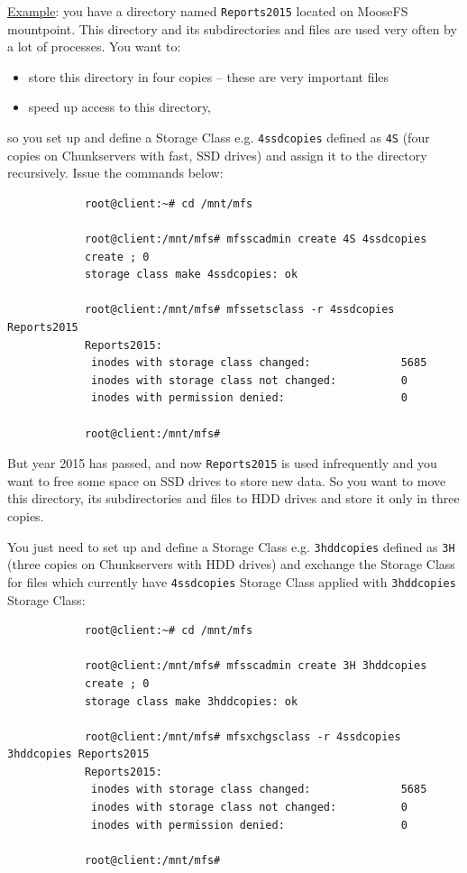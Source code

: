 \documentclass[a4paper,11pt,english]{report}
\def\code#1{\texttt{#1}}
\begin{document}
			\underline{Example}: you have a directory named \code{Reports2015} located on MooseFS mountpoint. This directory and its subdirectories and files are used very often by a lot of processes. You want to:
			
			\begin{itemize}
				\item store this directory in four copies -- these are very important files
				\item speed up access to this directory,
			\end{itemize}
			
			so you set up and define a Storage Class e.g. \code{4ssdcopies} defined as \code{4S} (four copies on Chunkservers with fast, SSD drives) and assign it to the directory recursively. Issue the commands below:
			
			\begin{lstlisting}
			root@client:~# cd /mnt/mfs
			
			root@client:/mnt/mfs# mfsscadmin create 4S 4ssdcopies
			create ; 0
			storage class make 4ssdcopies: ok
			
			root@client:/mnt/mfs# mfssetsclass -r 4ssdcopies Reports2015
			Reports2015:
			 inodes with storage class changed:              5685
			 inodes with storage class not changed:          0
			 inodes with permission denied:                  0
			 
			root@client:/mnt/mfs#
			\end{lstlisting}
			
			But year 2015 has passed, and now \code{Reports2015} is used infrequently and you want to free some space on SSD drives to store new data. So you want to move this directory, its subdirectories and files to HDD drives and store it only in three copies.
			
			You just need to set up and define a Storage Class e.g. \code{3hddcopies} defined as \code{3H} (three copies on Chunkservers with HDD drives) and exchange the Storage Class for files which currently have \code{4ssdcopies} Storage Class applied with \code{3hddcopies} Storage Class:
			
			\begin{lstlisting}
			root@client:~# cd /mnt/mfs
			
			root@client:/mnt/mfs# mfsscadmin create 3H 3hddcopies
			create ; 0
			storage class make 3hddcopies: ok
			
			root@client:/mnt/mfs# mfsxchgsclass -r 4ssdcopies 3hddcopies Reports2015
			Reports2015:
			 inodes with storage class changed:              5685
			 inodes with storage class not changed:          0
			 inodes with permission denied:                  0
			 
			root@client:/mnt/mfs#
			\end{lstlisting}
			
\end{document}
